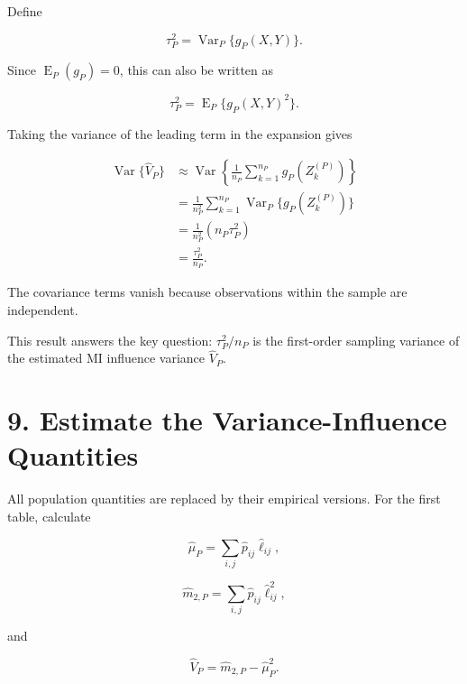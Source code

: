 \documentclass[
  11pt]{article}
\let\originalsection\section
\renewcommand{\section}{\clearpage\originalsection}
\begin{document}
Define

\begin{equation}
\boxed{
\tau_P^2
=\operatorname{Var}_P\{g_P(X,Y)\}.
}
\end{equation}

Since \(\operatorname E_P(g_P)=0\), this can also be written as

\begin{equation}
\tau_P^2
=\operatorname E_P\{g_P(X,Y)^2\}.
\end{equation}

Taking the variance of the leading term in the expansion gives

\begin{equation}
\begin{aligned}
\operatorname{Var}\{\widehat V_P\}
&\approx
\operatorname{Var}\left\{
\frac{1}{n_P}\sum_{k=1}^{n_P}g_P(Z_k^{(P)})
\right\}\\
&=\frac{1}{n_P^2}
\sum_{k=1}^{n_P}\operatorname{Var}_P\{g_P(Z_k^{(P)})\}\\
&=\frac{1}{n_P^2}(n_P\tau_P^2)\\
&=\boxed{\frac{\tau_P^2}{n_P}}.
\end{aligned}
\end{equation}

The covariance terms vanish because observations within the sample are
independent.

This result answers the key question: \(\tau_P^2/n_P\) is the
first-order sampling variance of the estimated MI influence variance
\(\widehat V_P\).

\section{9. Estimate the Variance-Influence
Quantities}\label{estimate-the-variance-influence-quantities}

All population quantities are replaced by their empirical versions. For
the first table, calculate

\begin{equation}
\widehat\mu_P
=\sum_{i,j}\widehat p_{ij}\widehat\ell_{ij},
\end{equation}

\begin{equation}
\widehat m_{2,P}
=\sum_{i,j}\widehat p_{ij}\widehat\ell_{ij}^2,
\end{equation}

and

\begin{equation}
\widehat V_P
=\widehat m_{2,P}-\widehat\mu_P^2.
\end{equation}
\end{document}
